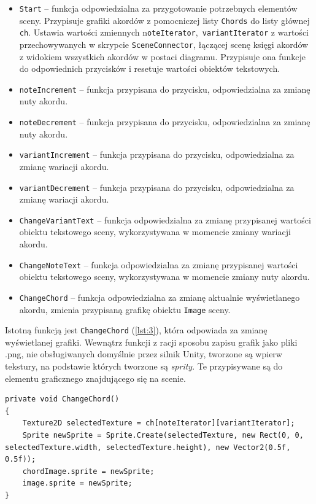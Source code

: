 \begin{itemize}
    \item \texttt{Start} -- funkcja odpowiedzialna za przygotowanie potrzebnych elementów sceny. Przypisuje grafiki akordów z pomocniczej listy \texttt{Chords} do listy głównej \texttt{ch}. Ustawia wartości zmiennych n\texttt{oteIterator},\texttt{ variantIterator} z wartości przechowywanych w skrypcie \texttt{SceneConnector}, łączącej scenę księgi akordów z widokiem wszystkich akordów w postaci diagramu. Przypisuje ona funkcje do odpowiednich przycisków i resetuje wartości obiektów tekstowych.
    \item \texttt{noteIncrement} -- funkcja przypisana do przycisku, odpowiedzialna za zmianę nuty akordu.
    \item \texttt{noteDecrement} -- funkcja przypisana do przycisku, odpowiedzialna za zmianę nuty akordu.
    \item \texttt{variantIncrement} -- funkcja przypisana do przycisku, odpowiedzialna za zmianę wariacji akordu.
    \item \texttt{variantDecrement} -- funkcja przypisana do przycisku, odpowiedzialna za zmianę wariacji akordu.
    \item \texttt{ChangeVariantText} -- funkcja odpowiedzialna za zmianę przypisanej wartości obiektu tekstowego sceny, wykorzystywana w momencie zmiany wariacji akordu.
    \item \texttt{ChangeNoteText} -- funkcja odpowiedzialna za zmianę przypisanej wartości obiektu tekstowego sceny, wykorzystywana w momencie zmiany nuty akordu.
    \item \texttt{ChangeChord} -- funkcja odpowiedzialna za zmianę aktualnie wyświetlanego akordu, zmienia przypisaną grafikę obiektu \texttt{Image} sceny.
\end{itemize}

Istotną funkcją jest \texttt{ChangeChord} (\ref{lst:3}), która odpowiada za zmianę wyświetlanej grafiki. Wewnątrz funkcji z racji sposobu zapisu grafik jako pliki .png, nie obsługiwanych domyślnie przez silnik Unity, tworzone są wpierw tekstury, na podstawie których tworzone są \emph{sprity}. Te przypisywane są do elementu graficznego znajdującego się na scenie.

\begin{lstlisting}[style=sharpcstyle,caption=Funkcja \texttt{ChangeChord}, label=lst:3]
private void ChangeChord()
{
    Texture2D selectedTexture = ch[noteIterator][variantIterator];
    Sprite newSprite = Sprite.Create(selectedTexture, new Rect(0, 0, selectedTexture.width, selectedTexture.height), new Vector2(0.5f, 0.5f));        
    chordImage.sprite = newSprite;        
    image.sprite = newSprite;
}
\end{lstlisting}

